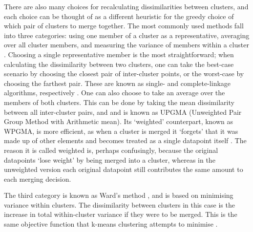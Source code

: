 There are also many choices for recalculating dissimilarities between clusters, and each choice can be thought of as a different heuristic for the greedy choice of which pair of clusters to merge together.
The most commonly used methods fall into three categories: using one member of a cluster as a representative, averaging over all cluster members, and measuring the variance of members within a cluster \cite{Roux2018}.
Choosing a single representative member is the most straightforward; when calculating the dissimilarity between two clusters, one can take the best-case scenario by choosing the closest pair of inter-cluster points, or the worst-case by choosing the farthest pair. These are known as single- and complete-linkage algorithms, respectively \cite{Sibson1973, Defays1977}.
One can also choose to take an average over the members of both clusters. This can be done by taking the mean dissimilarity between all inter-cluster pairs, and and is known as UPGMA (Unweighted Pair Group Method with Arithmetic mean). Its `weighted' counterpart, known as WPGMA, is more efficient, as when a cluster is merged it `forgets' that it was made up of other elements and becomes treated as a single datapoint itself \cite{Sneath1973}. The reason it is called weighted is, perhaps confusingly, because the original datapoints `lose weight' by being merged into a cluster, whereas in the unweighted version each original datapoint still contributes the same amount to each merging decision.

The third category is known as Ward's method \cite{WardJr1963}, and is based on minimising variance within clusters. The dissimilarity between clusters in this case is the increase in total within-cluster variance if they were to be merged. This is the same objective function that k-means clustering attempts to minimise \cite{Friedman2001Nearest}.

